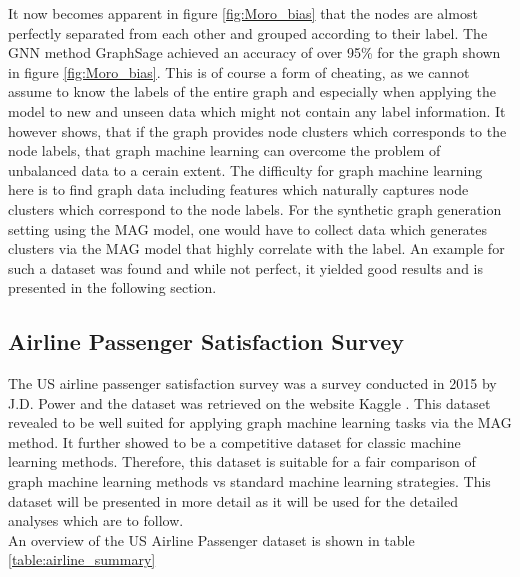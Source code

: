   \noindent It now becomes apparent in figure \ref{fig:Moro_bias} that the
  nodes are almost perfectly separated from each other and grouped according to 
  their label. The GNN method GraphSage achieved an accuracy of over 95\% for 
  the graph shown in figure \ref{fig:Moro_bias}. This is of course a form of 
  cheating, as we cannot assume to know the labels of the entire graph and 
  especially when applying the model to new and unseen data which might not 
  contain any label information. It however shows, that if the graph provides 
  node clusters which corresponds to the node labels, that graph machine 
  learning can overcome the problem of unbalanced data to a cerain extent. 
  The difficulty for graph machine learning here is to find graph data including 
  features which naturally captures node clusters which correspond to the node 
  labels. For the synthetic graph generation setting using the MAG model, one 
  would have to collect data which generates clusters via the MAG model that 
  highly correlate with the label. An example for such a dataset was found and 
  while not perfect, it yielded good results and is presented in the following 
  section. 

  \subsection{Airline Passenger Satisfaction Survey}
  
  The US airline passenger satisfaction survey was a survey conducted in 2015
  by J.D. Power and the dataset was retrieved on the website Kaggle
  \citep{JDPower2015,KAGGLE2015}. This dataset revealed to be well suited for
  applying graph machine learning tasks via the MAG method. It further showed
  to be a competitive dataset for classic machine learning methods. Therefore,
  this dataset is suitable for a fair comparison of graph machine learning
  methods vs standard machine learning strategies. This dataset will be
  presented in more detail as it will be used for the detailed analyses which
  are to follow. \\

  \noindent An overview of the US Airline Passenger dataset is shown in table
  \ref{table:airline_summary}

